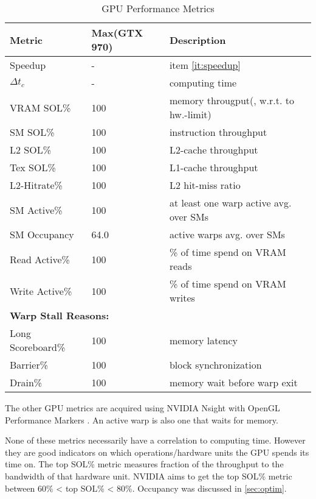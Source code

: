 \documentclass[m,times]{cgMA}
\begin{document}
\begin{table}
  \begin{tabular}{ | l | l | l |}    \hline
    \textbf{Metric}   & \textbf{Max}(GTX 970) & \textbf{Description} \\ \hline
    Speedup           & -                     & item \ref{it:speedup}\\\hline
    $\Delta t_c$      & -                     & computing time\\\hline
    VRAM SOL\%        & 100                   & memory througput(, w.r.t. to hw.-limit)\\\hline
    SM SOL\%          & 100                   & instruction throughput\\\hline
    L2 SOL\%          & 100                   & L2-cache throughput\\\hline
    Tex SOL\%         & 100                   & L1-cache throughput\\\hline
    L2-Hitrate\%      & 100                   & L2 hit-miss ratio\\\hline
    SM Active\%       & 100                   & at least one warp active avg. over SMs\\\hline
    SM Occupancy      & 64.0                  & active warps avg. over SMs\\\hline
    Read Active\%     & 100                   & \% of time spend on VRAM reads\\\hline
    Write Active\%    & 100                   & \% of time spend on VRAM writes\\\hline
    \multicolumn{3}{|l|}{\textbf{Warp Stall Reasons:}}\\\hline
    Long Scoreboard\% & 100                   & memory latency\\\hline
    Barrier\%         & 100                   & block synchronization \\\hline
    Drain\%           & 100                   & memory wait before warp exit \\
    \hline
  \end{tabular}
\caption{GPU Performance Metrics}\label{table:metric}
\end{table}
The other GPU metrics are acquired using NVIDIA Nsight with OpenGL Performance Markers \cite{NVIDIA:METRICS}. An active warp is also one that waits for memory.

None of these metrics necessarily have a correlation to computing time. However they are good indicators on which operations/hardware units the GPU spends its time on. The top SOL\% metric measures fraction of the throughput to the bandwidth of that hardware unit. NVIDIA aims to get the top SOL\% metric between 60\% < top SOL\% < 80\%. Occupancy was discussed in \ref{sec:optim}. \cite{NVIDIA:PEAK_PERFORMANCE}
\end{document}
